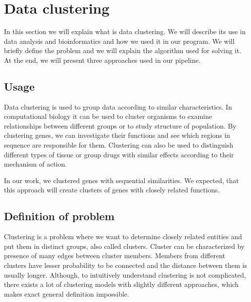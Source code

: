 \section{Data clustering}
In this section we will explain what is data clustering.
We will describe its use in data analysis and bioinformatics and how we used it in our program.
We will briefly define the problem and we will explain the algorithm used for solving it.
At the end, we will present three approaches used in our pipeline.

\subsection{Usage}
Data clustering is used to group data according to similar characteristics.
In computational biology it can be used to cluster organisms to examine relationships between different groups or to study structure of population.
By clustering genes, we can investigate their functions and see which regions in sequence are responsible for them.
Clustering can also be used to distinguish different types of tissue or group drugs with similar effects according to their mechanism of action.

In our work, we clustered genes with sequential similarities.
We expected, that this approach will create clusters of genes with closely related functions.

\subsection{Definition of problem}
Clustering is a problem where we want to determine closely related entities and put them in distinct groups, also called clusters.
Cluster can be characterized by presence of many edges between cluster members.
Members from different clusters have lesser probability to be connected and the distance between them is usually longer.
Although, to intuitively understand clustering is not complicated, there exists a lot of clustering models with slightly different approaches, which makes exact general definition impossible.  


